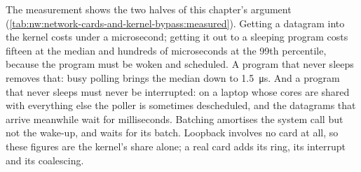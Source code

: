 The measurement shows the two halves of this chapter's argument (\cref{tab:nw:network-cards-and-kernel-bypass:measured}). Getting a
datagram into the kernel costs under a microsecond; getting it out to a sleeping program costs fifteen at the median and hundreds of
microseconds at the 99th percentile, because the program must be woken and scheduled. A program that never sleeps removes that: busy
polling brings the median down to \qty{1.5}{\micro\second}. And a program that never sleeps must never be interrupted: on a laptop
whose cores are shared with everything else the poller is sometimes descheduled, and the datagrams that arrive meanwhile wait for
milliseconds. Batching amortises the system call but not the wake-up, and waits for its batch. Loopback involves no card at all, so
these figures are the kernel's share alone; a real card adds its ring, its interrupt and its coalescing.

\label{lst:nw:network-cards-and-kernel-bypass:model}

